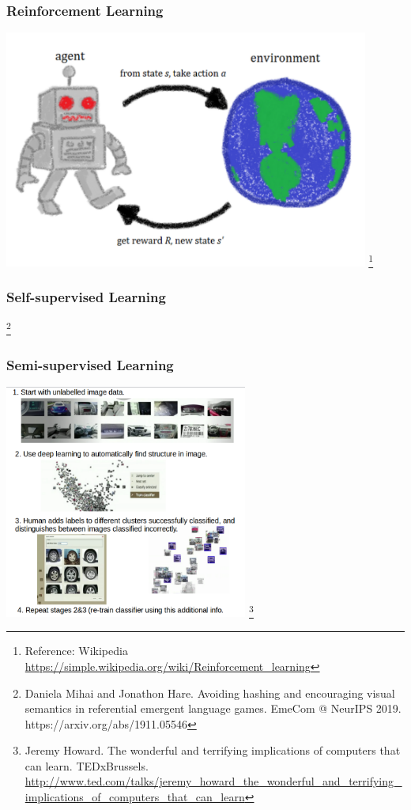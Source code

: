 \documentclass[\beamerclass]{beamer}
\newcommand\blfootnote[1]{%
  \begingroup
  \renewcommand\thefootnote{}\footnote{#1}%
  \addtocounter{footnote}{-1}%
  \endgroup
}
\begin{document}
\begin{frame}[fragile]\frametitle{Reinforcement Learning}
\begin{center}
  \includegraphics[width=0.9\textwidth]{figs/RL.pdf}
  \blfootnote{Reference: Wikipedia \url{https://simple.wikipedia.org/wiki/Reinforcement_learning}}
\end{center}
\end{frame}

\begin{frame}[fragile]\frametitle{Self-supervised Learning}
\begin{center}
  \resizebox{0.8\textwidth}{!}{\unskip}
  \blfootnote{Daniela Mihai and Jonathon Hare. Avoiding hashing and encouraging visual semantics in referential emergent language games. EmeCom @ NeurIPS 2019. https://arxiv.org/abs/1911.05546}
\end{center}

\end{frame}

\begin{frame}[fragile]\frametitle{Semi-supervised Learning}
\begin{center}
 \includegraphics[width=0.6\textwidth]{figs/SS.png}\blfootnote{Jeremy Howard. The wonderful and terrifying implications of computers that can learn. TEDxBrussels. \url{http://www.ted.com/talks/jeremy_howard_the_wonderful_and_terrifying_implications_of_computers_that_can_learn}}
\end{center}
\end{frame}
\end{document}
